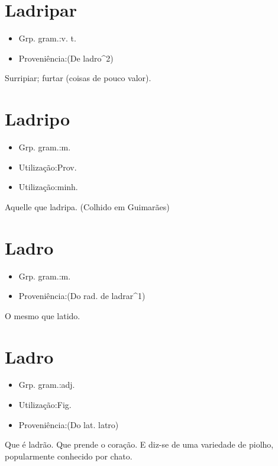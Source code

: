 \section{Ladripar}
\begin{itemize}
\item {Grp. gram.:v. t.}
\end{itemize}
\begin{itemize}
\item {Proveniência:(De \textunderscore ladro\textunderscore ^2)}
\end{itemize}
Surripiar; furtar (coisas de pouco valor).
\section{Ladripo}
\begin{itemize}
\item {Grp. gram.:m.}
\end{itemize}
\begin{itemize}
\item {Utilização:Prov.}
\end{itemize}
\begin{itemize}
\item {Utilização:minh.}
\end{itemize}
Aquelle que ladripa.
(Colhido em Guimarães)
\section{Ladro}
\begin{itemize}
\item {Grp. gram.:m.}
\end{itemize}
\begin{itemize}
\item {Proveniência:(Do rad. de \textunderscore ladrar\textunderscore ^1)}
\end{itemize}
O mesmo que \textunderscore latido\textunderscore .
\section{Ladro}
\begin{itemize}
\item {Grp. gram.:adj.}
\end{itemize}
\begin{itemize}
\item {Utilização:Fig.}
\end{itemize}
\begin{itemize}
\item {Proveniência:(Do lat. \textunderscore latro\textunderscore )}
\end{itemize}
Que é ladrão.
Que prende o coração.
E diz-se de uma variedade de piolho, popularmente conhecido por \textunderscore chato\textunderscore .
